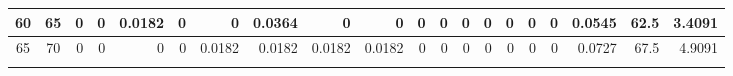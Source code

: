 \begin{table}[ht]
\begin{adjustbox}{width = \textwidth, center}
\begin{tabular}{|cc|r|r|r|r|r|r|r|r|r|r|r|r|r|r|r|rrr|}
        \cellcolor[HTML]{C8E4BE}60           & \cellcolor[HTML]{D9EAD3}65          & 0                                              & 0                                              & \cellcolor[HTML]{C7E9D8}0.0182                 & 0                                              & 0                                              & \cellcolor[HTML]{8FD2B1}0.0364                 & 0                                              & 0                                               & 0                                               & 0                                               & 0                                               & 0                                               & 0                                               & 0                                               & 0                                               & \multicolumn{1}{r|}{\cellcolor[HTML]{D9D2E9}0.0545}                                   & \multicolumn{1}{r|}{\cellcolor[HTML]{D9D2E9}62.5}                       & \cellcolor[HTML]{D9D2E9}3.4091                                                              \\ \hline
        \rowcolor[HTML]{FFFFFF} 
        \cellcolor[HTML]{C8E4BE}65           & \cellcolor[HTML]{D9EAD3}70          & 0                                              & 0                                              & 0                                              & 0                                              & \cellcolor[HTML]{C7E9D8}0.0182                 & \cellcolor[HTML]{C7E9D8}0.0182                 & \cellcolor[HTML]{C7E9D8}0.0182                 & \cellcolor[HTML]{C7E9D8}0.0182                  & 0                                               & 0                                               & 0                                               & 0                                               & 0                                               & 0                                               & 0                                               & \multicolumn{1}{r|}{\cellcolor[HTML]{D9D2E9}0.0727}                                   & \multicolumn{1}{r|}{\cellcolor[HTML]{D9D2E9}67.5}                       & \cellcolor[HTML]{D9D2E9}4.9091                                                              \\ \hline
        \rowcolor[HTML]{FFFFFF} 

\end{tabular}
\end{adjustbox}
\end{table}
